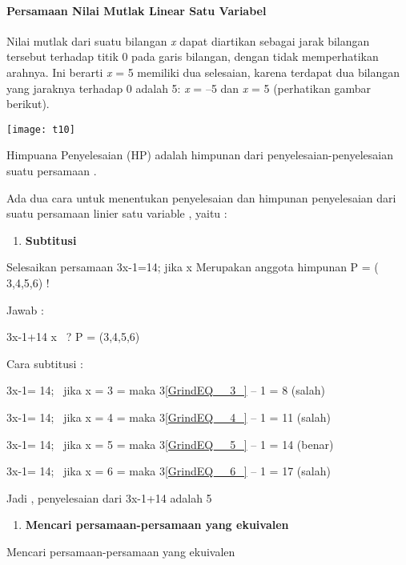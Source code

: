 \documentclass[11pt,fleqn]{book} %
\begin{document}
\paragraph{ Persamaan Nilai Mutlak Linear Satu Variabel}

Nilai mutlak dari suatu bilangan \textit{x} dapat diartikan sebagai jarak bilangan tersebut terhadap titik 0 pada garis bilangan, dengan tidak memperhatikan arahnya. Ini berarti {\textbar}\textit{x}{\textbar} = 5 memiliki dua selesaian, karena terdapat dua bilangan yang jaraknya terhadap 0 adalah 5: \textit{x} = --5 dan \textit{x} = 5 (perhatikan gambar berikut).

\noindent \texttt{[image: t10]}

Himpuana Penyelesaian (HP) adalah himpunan dari penyelesaian-penyelesaian suatu persamaan .

\noindent Ada dua cara untuk menentukan penyelesaian dan himpunan penyelesaian dari suatu persamaan linier satu variable , yaitu :

\begin{enumerate}
\item  \textbf{Subtitusi }
\end{enumerate}

\noindent Selesaikan persamaan 3x-1=14; jika x Merupakan anggota himpunan P = ( 3,4,5,6) !

\noindent Jawab :

\noindent 3x-1+14 x ~? P = (3,4,5,6)

\noindent Cara subtitusi :

\noindent 3x-1= 14;~ jika x = 3 = maka 3\eqref{GrindEQ__3_} -- 1 = 8 (salah)

\noindent 3x-1= 14;~ jika x = 4 = maka 3\eqref{GrindEQ__4_} -- 1 = 11 (salah)

\noindent 3x-1= 14;~ jika x = 5 = maka 3\eqref{GrindEQ__5_} -- 1 = 14 (benar)

\noindent 3x-1= 14;~ jika x = 6 = maka 3\eqref{GrindEQ__6_} -- 1 = 17 (salah)

\noindent Jadi , penyelesaian dari 3x-1+14 adalah 5

\noindent 

\begin{enumerate}
\item  \textbf{Mencari persamaan-persamaan yang ekuivalen}
\end{enumerate}

Mencari persamaan-persamaan yang ekuivalen
\end{document}
